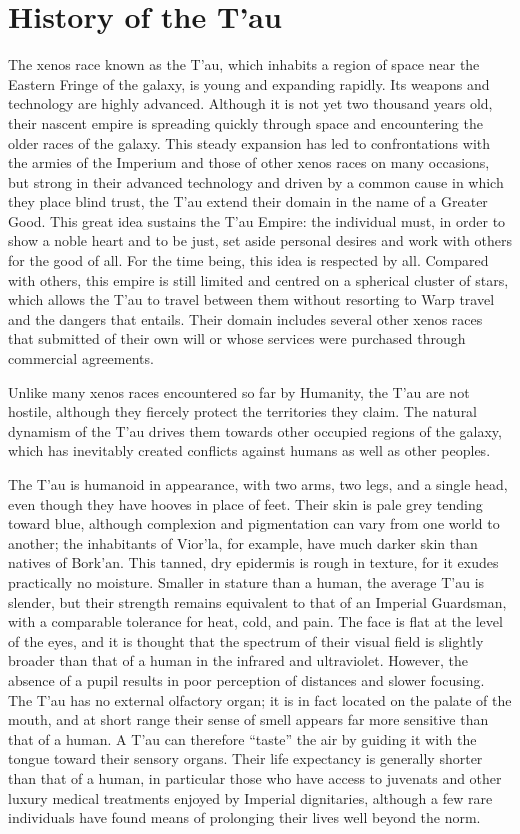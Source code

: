 \section{History of the T'au}

The xenos race known as the T'au, which inhabits a region of space near the Eastern Fringe of the galaxy, is young and expanding rapidly. Its weapons and technology are highly advanced. Although it is not yet two thousand years old, their nascent empire is spreading quickly through space and encountering the older races of the galaxy. This steady expansion has led to confrontations with the armies of the Imperium and those of other xenos races on many occasions, but strong in their advanced technology and driven by a common cause in which they place blind trust, the T'au extend their domain in the name of a Greater Good. This great idea sustains the T'au Empire: the individual must, in order to show a noble heart and to be just, set aside personal desires and work with others for the good of all. For the time being, this idea is respected by all. Compared with others, this empire is still limited and centred on a spherical cluster of stars, which allows the T'au to travel between them without resorting to Warp travel and the dangers that entails. Their domain includes several other xenos races that submitted of their own will or whose services were purchased through commercial agreements.

Unlike many xenos races encountered so far by Humanity, the T'au are not hostile, although they fiercely protect the territories they claim. The natural dynamism of the T'au drives them towards other occupied regions of the galaxy, which has inevitably created conflicts against humans as well as other peoples.

The T'au is humanoid in appearance, with two arms, two legs, and a single head, even though they have hooves in place of feet. Their skin is pale grey tending toward blue, although complexion and pigmentation can vary from one world to another; the inhabitants of Vior'la, for example, have much darker skin than natives of Bork'an. This tanned, dry epidermis is rough in texture, for it exudes practically no moisture. Smaller in stature than a human, the average T'au is slender, but their strength remains equivalent to that of an Imperial Guardsman, with a comparable tolerance for heat, cold, and pain. The face is flat at the level of the eyes, and it is thought that the spectrum of their visual field is slightly broader than that of a human in the infrared and ultraviolet. However, the absence of a pupil results in poor perception of distances and slower focusing. The T'au has no external olfactory organ; it is in fact located on the palate of the mouth, and at short range their sense of smell appears far more sensitive than that of a human. A T'au can therefore ``taste'' the air by guiding it with the tongue toward their sensory organs. Their life expectancy is generally shorter than that of a human, in particular those who have access to juvenats and other luxury medical treatments enjoyed by Imperial dignitaries, although a few rare individuals have found means of prolonging their lives well beyond the norm.

